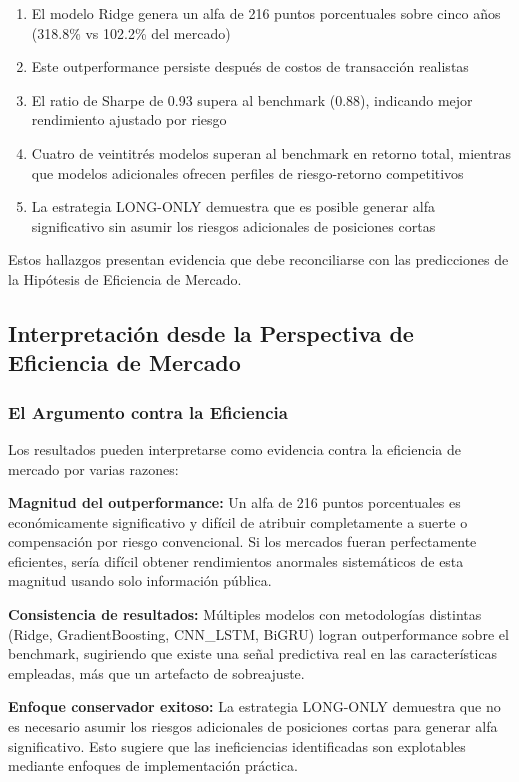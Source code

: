 \documentclass[11pt,a4paper]{article}
\begin{document}
\begin{enumerate}[noitemsep]
    \item El modelo Ridge genera un alfa de 216 puntos porcentuales sobre cinco años (318.8\% vs 102.2\% del mercado)
    \item Este outperformance persiste después de costos de transacción realistas
    \item El ratio de Sharpe de 0.93 supera al benchmark (0.88), indicando mejor rendimiento ajustado por riesgo
    \item Cuatro de veintitrés modelos superan al benchmark en retorno total, mientras que modelos adicionales ofrecen perfiles de riesgo-retorno competitivos
    \item La estrategia LONG-ONLY demuestra que es posible generar alfa significativo sin asumir los riesgos adicionales de posiciones cortas
\end{enumerate}

Estos hallazgos presentan evidencia que debe reconciliarse con las predicciones de la Hipótesis de Eficiencia de Mercado.

\subsection{Interpretación desde la Perspectiva de Eficiencia de Mercado}

\subsubsection{El Argumento contra la Eficiencia}

Los resultados pueden interpretarse como evidencia contra la eficiencia de mercado por varias razones:

\textbf{Magnitud del outperformance:} Un alfa de 216 puntos porcentuales es económicamente significativo y difícil de atribuir completamente a suerte o compensación por riesgo convencional. Si los mercados fueran perfectamente eficientes, sería difícil obtener rendimientos anormales sistemáticos de esta magnitud usando solo información pública.

\textbf{Consistencia de resultados:} Múltiples modelos con metodologías distintas (Ridge, GradientBoosting, CNN\_LSTM, BiGRU) logran outperformance sobre el benchmark, sugiriendo que existe una señal predictiva real en las características empleadas, más que un artefacto de sobreajuste.

\textbf{Enfoque conservador exitoso:} La estrategia LONG-ONLY demuestra que no es necesario asumir los riesgos adicionales de posiciones cortas para generar alfa significativo. Esto sugiere que las ineficiencias identificadas son explotables mediante enfoques de implementación práctica.
\end{document}
